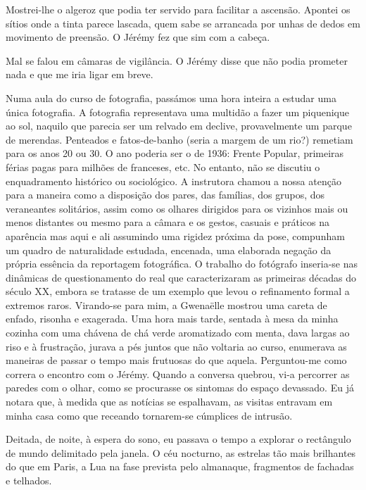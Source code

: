 Mostrei-lhe o algeroz que podia ter servido para facilitar a
ascensão. Apontei os sítios onde a tinta parece lascada, quem sabe
se arrancada por unhas de dedos em movimento de preensão. O Jérémy fez
que sim com a cabeça.

Mal se falou em câmaras de vigilância. O Jérémy disse que não podia
prometer nada e que me iria ligar em breve.

Numa aula do curso de fotografia, passámos uma hora inteira a estudar
uma única fotografia. A fotografia representava uma multidão a fazer
um piquenique ao sol, naquilo que parecia ser um relvado em declive,
provavelmente um parque de merendas. Penteados e fatos-de-banho (seria a
margem de um rio?) remetiam para os anos 20 ou 30. O ano poderia ser o
de 1936: Frente Popular, primeiras férias pagas para milhões de
franceses, etc. No entanto, não se discutiu o enquadramento histórico
ou sociológico. A instrutora chamou a nossa atenção para a maneira como
a disposição dos pares, das famílias, dos grupos, dos veraneantes
solitários, assim como os olhares dirigidos para os vizinhos mais ou
menos distantes ou mesmo para a câmara e os gestos, casuais e práticos
na aparência mas aqui e ali assumindo uma rigidez próxima da pose,
compunham um quadro de naturalidade estudada, encenada, uma elaborada
negação da própria essência da reportagem fotográfica. O trabalho do
fotógrafo inseria-se nas dinâmicas de questionamento do real que
caracterizaram as primeiras décadas do século XX, embora se tratasse de
um exemplo que levou o refinamento formal a extremos raros. Virando-se
para mim, a Gwenaëlle mostrou uma careta de enfado, risonha e exagerada.
Uma hora mais tarde, sentada à mesa da minha cozinha com uma chávena de
chá verde aromatizado com menta, dava largas ao riso e à frustração,
jurava a pés juntos que não voltaria ao curso, enumerava as maneiras de
passar o tempo mais frutuosas do que aquela. Perguntou-me como
correra o encontro com o Jérémy. Quando a conversa quebrou, vi-a
percorrer as paredes com o olhar, como se procurasse os sintomas do
espaço devassado. Eu já notara que, à medida que as notícias se
espalhavam, as visitas entravam em minha casa como que receando
tornarem-se cúmplices de intrusão.

Deitada, de noite, à espera do sono, eu passava o tempo a explorar o
rectângulo de mundo delimitado pela janela. O céu nocturno, as estrelas
tão mais brilhantes do que em Paris, a Lua na fase prevista pelo
almanaque, fragmentos de fachadas e telhados.

